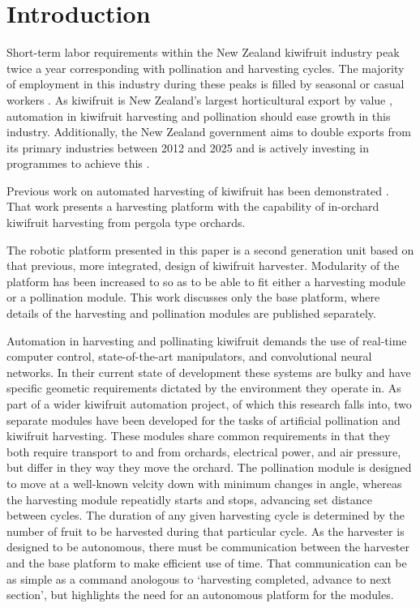 \documentclass[preprint,authoryear,12pt]{elsarticle}
\begin{document}

\section{Introduction}
\label{sect:intro}
Short-term labor requirements within the New Zealand kiwifruit industry peak twice a year corresponding with pollination and harvesting cycles.
The majority of employment in this industry during these peaks is filled by seasonal or casual workers \citep{Timmins2009}.
As kiwifruit is New Zealand's largest horticultural export by value \citep{StatisticsNewZealand2015}, automation in kiwifruit harvesting and pollination should ease growth in this industry.
Additionally, the New Zealand government aims to double exports from its primary industries between 2012 and 2025 and is actively investing in programmes to achieve this \citep{MinistryPrimaryIndustries2015}.

Previous work on automated harvesting of kiwifruit has been demonstrated \citep{Scarfe2012,scarfe2009}.
That work presents a harvesting platform with the capability of in-orchard kiwifruit harvesting from pergola type orchards.

The robotic platform presented in this paper is a second generation unit based on that previous, more integrated, design of kiwifruit harvester.
Modularity of the platform has been increased to so as to be able to fit either a harvesting module or a pollination module.
This work discusses only the base platform, where details of the harvesting and pollination modules are published separately.

Automation in harvesting and pollinating kiwifruit demands the use of real-time computer control, state-of-the-art manipulators, and convolutional neural networks.
In their current state of development these systems are bulky and have specific geometic requirements dictated by the environment they operate in.
As part of a wider kiwifruit automation project, of which this research falls into, two separate modules have been developed for the tasks of artificial pollination and kiwifruit harvesting.
These modules share common requirements in that they both require transport to and from orchards, electrical power, and air pressure, but differ in they way they move the orchard.
The pollination module is designed to move at a well-known velcity down with minimum changes in angle, whereas the harvesting module repeatidly starts and stops, advancing set distance between cycles.
The duration of any given harvesting cycle is determined by the number of fruit to be harvested during that particular cycle.
As the harvester is designed to be autonomous, there must be communication between the harvester and the base platform to make efficient use of time.
That communication can be as simple as a command anologous to `harvesting completed, advance to next section', but highlights the need for an autonomous platform for the modules.
\end{document}
